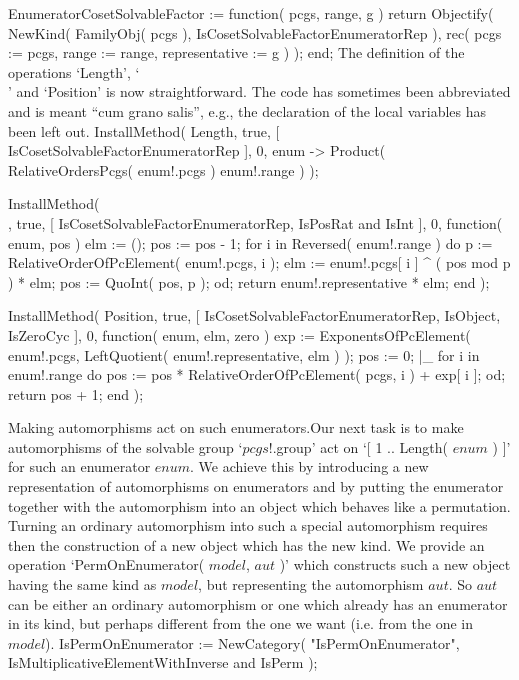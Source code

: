 EnumeratorCosetSolvableFactor := function( pcgs, range, g )
    return Objectify( NewKind( FamilyObj( pcgs ),
                   IsCosetSolvableFactorEnumeratorRep ),
                   rec( pcgs := pcgs,
                       range := range,
              representative := g ) );
end;
\endtt
The definition of the operations `Length', `\\[\\]' and `Position' is now
straightforward. The  code has sometimes  been  abbreviated and is  meant
``cum grano salis'',  e.g.,  the declaration of  the local  variables has
been left out.
\begintt
InstallMethod( Length, true, [ IsCosetSolvableFactorEnumeratorRep ], 0,
    enum -> Product( RelativeOrdersPcgs( enum!.pcgs ){ enum!.range } ) );

InstallMethod( \[\], true, [ IsCosetSolvableFactorEnumeratorRep,
        IsPosRat and IsInt ], 0,
    function( enum, pos )
    elm := ();
    pos := pos - 1;
    for i  in Reversed( enum!.range )  do
        p := RelativeOrderOfPcElement( enum!.pcgs, i );
        elm := enum!.pcgs[ i ] ^ ( pos mod p ) * elm;
        pos := QuoInt( pos, p );
    od;
    return enum!.representative * elm;
end );

InstallMethod( Position, true, [ IsCosetSolvableFactorEnumeratorRep,
        IsObject, IsZeroCyc ], 0,
    function( enum, elm, zero )
    exp := ExponentsOfPcElement( enum!.pcgs,
                   LeftQuotient( enum!.representative, elm ) );
    pos := 0;
|_
    for i  in enum!.range  do
        pos := pos * RelativeOrderOfPcElement( pcgs, i ) + exp[ i ];
    od;
    return pos + 1;
end );
\endtt

{\bsf  Making automorphisms act  on such enumerators.}\quad Our next task
is to make automorphisms of the  solvable group `$pcgs$!.group' act on `[
1 .. Length( $enum$ )  ]' for such an  enumerator $enum$. We achieve this
by  introducing a new  representation of automorphisms on enumerators and
by putting the enumerator together  with the automorphism into an  object
which behaves like  a permutation. Turning  an ordinary automorphism into
such  a special  automorphism requires  then   the construction of  a new
object which has the new kind. We provide an operation `PermOnEnumerator(
$model$, $aut$ )' which constructs such a new object having the same kind
as  $model$,  but representing the  automorphism  $aut$. So $aut$  can be
either an ordinary automorphism or one which already has an enumerator in
its kind, but perhaps  different from the one  we want (i.e. from the one
in $model$).
\begintt
IsPermOnEnumerator := NewCategory( "IsPermOnEnumerator",
    IsMultiplicativeElementWithInverse and IsPerm );

